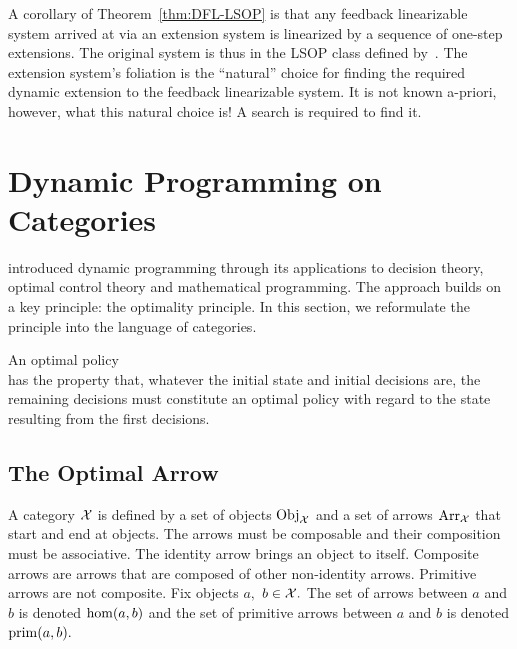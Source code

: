 \documentclass[a4paper]{ifacconf}
\begin{document}
A corollary of Theorem~\ref{thm:DFL-LSOP} is that any feedback linearizable system arrived at via an extension system is linearized by a sequence of one-step extensions.
The original system is thus in the LSOP class defined by~\cite{nicolau_dynamic_2025}.
The extension system's foliation is the ``natural'' choice for finding the required dynamic extension to the feedback linearizable system.
It is not known a-priori, however, what this natural choice is!
A search is required to find it.

\section{Dynamic Programming on Categories}
\label{section:dynamic-programming}
\cite{bellman_applications_1954} introduced dynamic programming through its applications to decision theory, optimal control theory and mathematical programming.
The approach builds on a key principle: the optimality principle.
In this section, we reformulate the principle into the language of categories.
%
\begin{prin}
  \label{principle:bellman}
  An optimal policy\\ has the property that, whatever the initial state and initial decisions are, the remaining decisions must constitute an optimal policy with regard to the state resulting from the first decisions.
\end{prin}

\subsection{The Optimal Arrow}
A category \(\mathcal{X}\) is defined by a set of objects \(\mathrm{Obj}_{\mathcal{X}}\) and a set of arrows \(\mathrm{Arr}_{\mathcal{X}}\) that start and end at objects.
The arrows must be composable and their composition must be associative.
The identity arrow brings an object to itself.
Composite arrows are arrows that are composed of other non-identity arrows.
Primitive arrows are not composite.
Fix objects \(a,\) \(b \in \mathcal{X}.\)
The set of arrows between \(a\) and \(b\) is denoted \(\mathrm{hom}(a,b)\) and the set of primitive arrows between \(a\) and \(b\) is denoted \(\mathrm{prim}(a, b).\)
\end{document}
